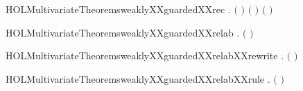 \newcommand{\HOLMultivariateTheoremsweaklyXXguardedXXprefixXXrule}{\UseVerbatim{HOLMultivariateTheoremsweaklyXXguardedXXprefixXXrule}}
\begin{SaveVerbatim}{HOLMultivariateTheoremsweaklyXXguardedXXrec}
\HOLTokenTurnstile{} \HOLSymConst{\HOLTokenForall{}}  .
         \ensuremath{(}  \ensuremath{)} \HOLSymConst{\HOLTokenImp{}}
        \ensuremath{(}   \ensuremath{)} \ensuremath{(} \ensuremath{)}
\end{SaveVerbatim}
\newcommand{\HOLMultivariateTheoremsweaklyXXguardedXXrec}{\UseVerbatim{HOLMultivariateTheoremsweaklyXXguardedXXrec}}
\begin{SaveVerbatim}{HOLMultivariateTheoremsweaklyXXguardedXXrelab}
\HOLTokenTurnstile{} \HOLSymConst{\HOLTokenForall{}}  .
         \ensuremath{(}  \ensuremath{)} \HOLSymConst{\HOLTokenImp{}}   
\end{SaveVerbatim}
\newcommand{\HOLMultivariateTheoremsweaklyXXguardedXXrelab}{\UseVerbatim{HOLMultivariateTheoremsweaklyXXguardedXXrelab}}
\begin{SaveVerbatim}{HOLMultivariateTheoremsweaklyXXguardedXXrelabXXrewrite}
\HOLTokenTurnstile{} \HOLSymConst{\HOLTokenForall{}}  .
         \ensuremath{(}  \ensuremath{)} \HOLSymConst{\HOLTokenEquiv{}}   
\end{SaveVerbatim}
\newcommand{\HOLMultivariateTheoremsweaklyXXguardedXXrelabXXrewrite}{\UseVerbatim{HOLMultivariateTheoremsweaklyXXguardedXXrelabXXrewrite}}
\begin{SaveVerbatim}{HOLMultivariateTheoremsweaklyXXguardedXXrelabXXrule}
\HOLTokenTurnstile{} \HOLSymConst{\HOLTokenForall{}}  .
          \HOLSymConst{\HOLTokenImp{}}   \ensuremath{(}  \ensuremath{)}
\end{SaveVerbatim}
\newcommand{\HOLMultivariateTheoremsweaklyXXguardedXXrelabXXrule}{\UseVerbatim{HOLMultivariateTheoremsweaklyXXguardedXXrelabXXrule}}
